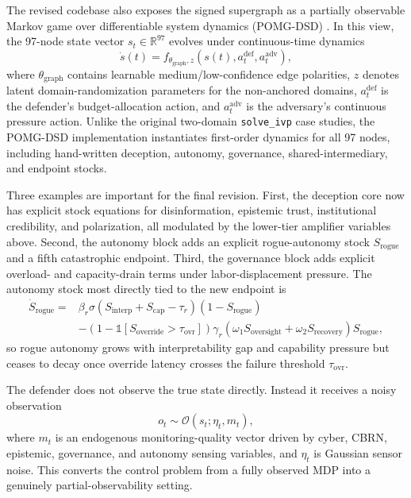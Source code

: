 \documentclass[11pt]{article}
\begin{document}
The revised codebase also exposes the signed supergraph as a partially observable Markov game over differentiable system dynamics (POMG-DSD) \citep{monahan1982,littman1994,schulman2017ppo,ames2017cbf,tobin2017,chen2018neuralode}. In this view, the 97-node state vector $s_t \in \mathbb{R}^{97}$ evolves under continuous-time dynamics
\begin{equation}
\dot{s}(t) = f_{\theta_{\text{graph}}, z}\!\left(s(t), a_t^{\text{def}}, a_t^{\text{adv}}\right),
\label{eq:pomg_dynamics}
\end{equation}
where $\theta_{\text{graph}}$ contains learnable medium/low-confidence edge polarities, $z$ denotes latent domain-randomization parameters for the non-anchored domains, $a_t^{\text{def}}$ is the defender's budget-allocation action, and $a_t^{\text{adv}}$ is the adversary's continuous pressure action. Unlike the original two-domain \texttt{solve\_ivp} case studies, the POMG-DSD implementation instantiates first-order dynamics for all 97 nodes, including hand-written deception, autonomy, governance, shared-intermediary, and endpoint stocks.

Three examples are important for the final revision. First, the deception core now has explicit stock equations for disinformation, epistemic trust, institutional credibility, and polarization, all modulated by the lower-tier amplifier variables above. Second, the autonomy block adds an explicit rogue-autonomy stock $S_{\text{rogue}}$ and a fifth catastrophic endpoint. Third, the governance block adds explicit overload- and capacity-drain terms under labor-displacement pressure. The autonomy stock most directly tied to the new endpoint is
\begin{equation}
\begin{aligned}
\dot{S}_{\text{rogue}} ={}& \beta_r \sigma\!\left(S_{\text{interp}} + S_{\text{cap}} - \tau_r\right)\left(1 - S_{\text{rogue}}\right) \\
&- \left(1 - \mathbb{1}[S_{\text{override}} > \tau_{\text{ovr}}]\right)\gamma_r\!\left(\omega_1 S_{\text{oversight}} + \omega_2 S_{\text{recovery}}\right) S_{\text{rogue}},
\end{aligned}
\label{eq:rogue}
\end{equation}
so rogue autonomy grows with interpretability gap and capability pressure but ceases to decay once override latency crosses the failure threshold $\tau_{\text{ovr}}$.

The defender does not observe the true state directly. Instead it receives a noisy observation
\begin{equation}
o_t \sim \mathcal{O}(s_t; \eta_t, m_t),
\end{equation}
where $m_t$ is an endogenous monitoring-quality vector driven by cyber, CBRN, epistemic, governance, and autonomy sensing variables, and $\eta_t$ is Gaussian sensor noise. This converts the control problem from a fully observed MDP into a genuinely partial-observability setting.
\end{document}
